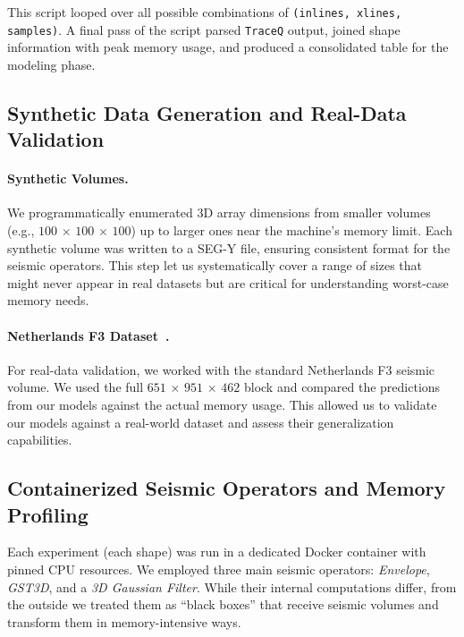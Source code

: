 This script looped over all possible combinations of \texttt{(inlines, xlines, samples)}.
A final pass of the script parsed \texttt{TraceQ} output, joined shape information with peak memory usage, and produced a consolidated table for the modeling phase.

\subsection{Synthetic Data Generation and Real-Data Validation}
\label{subsec:pmc-synthetic-data-generation-and-real-data-validation}

\paragraph{Synthetic Volumes.}
We programmatically enumerated \ac{3D} array dimensions from smaller volumes (e.g., $100$ $\times$ $100$ $\times$ $100$) up to larger ones near the machine’s memory limit.
Each synthetic volume was written to a \ac{SEG-Y} file, ensuring consistent format for the seismic operators.
This step let us systematically cover a range of sizes that might never appear in real datasets but are critical for understanding worst-case memory needs.

\paragraph{Netherlands F3 Dataset~\cite{f3dataset}.}
For real-data validation, we worked with the standard Netherlands F3 seismic volume.
We used the full $651$ $\times$ $951$ $\times$ $462$ block and compared the predictions from our models against the actual memory usage.
This allowed us to validate our models against a real-world dataset and assess their generalization capabilities.

\subsection{Containerized Seismic Operators and Memory Profiling}
\label{subsec:containerized-seismic-operators-and-memory-profiling}

Each experiment (each shape) was run in a dedicated Docker container with pinned \ac{CPU} resources.
We employed three main seismic operators:
\emph{Envelope}, \emph{\ac{GST3D}}, and a \emph{3D Gaussian Filter}.
While their internal computations differ, from the outside we treated them as “black boxes” that receive seismic volumes and transform them in memory-intensive ways.

